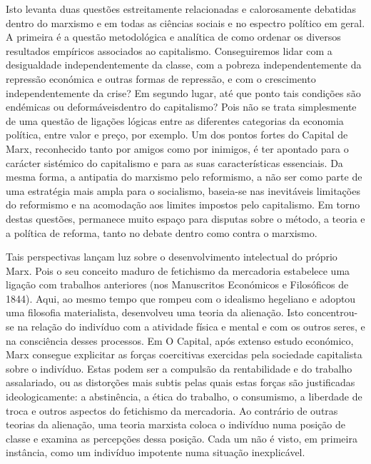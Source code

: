  \par 
Isto levanta duas questões estreitamente relacionadas e calorosamente debatidas dentro do marxismo e em todas as ciências sociais e no espectro político em geral. A primeira é a questão metodológica e analítica de como ordenar os diversos resultados empíricos associados ao capitalismo. Conseguiremos lidar com a desigualdade independentemente da classe, com a pobreza independentemente da repressão económica e outras formas de repressão, e com o crescimento independentemente da crise? Em segundo lugar, até que ponto tais condições são endémicas ou deformáveis ​​dentro do capitalismo? Pois não se trata simplesmente de uma questão de ligações lógicas entre as diferentes categorias da economia política, entre valor e preço, por exemplo. Um dos pontos fortes do Capital de Marx, reconhecido tanto por amigos como por inimigos, é ter apontado para o carácter sistémico do capitalismo e para as suas características essenciais. Da mesma forma, a antipatia do marxismo pelo reformismo, a não ser como parte de uma estratégia mais ampla para o socialismo, baseia-se nas inevitáveis ​​limitações do reformismo e na acomodação aos limites impostos pelo capitalismo. Em torno destas questões, permanece muito espaço para disputas sobre o método, a teoria e a política de reforma, tanto no debate dentro como contra o marxismo.
 \par 
Tais perspectivas lançam luz sobre o desenvolvimento intelectual do próprio Marx. Pois o seu conceito maduro de fetichismo da mercadoria estabelece uma ligação com trabalhos anteriores (nos Manuscritos Económicos e Filosóficos de 1844). Aqui, ao mesmo tempo que rompeu com o idealismo hegeliano e adoptou uma filosofia materialista, desenvolveu uma teoria da alienação. Isto concentrou-se na relação do indivíduo com a atividade física e mental e com os outros seres, e na consciência desses processos. Em O Capital, após extenso estudo económico, Marx consegue explicitar as forças coercitivas exercidas pela sociedade capitalista sobre o indivíduo. Estas podem ser a compulsão da rentabilidade e do trabalho assalariado, ou as distorções mais subtis pelas quais estas forças são justificadas ideologicamente: a abstinência, a ética do trabalho, o consumismo, a liberdade de troca e outros aspectos do fetichismo da mercadoria. Ao contrário de outras teorias da alienação, uma teoria marxista coloca o indivíduo numa posição de classe e examina as percepções dessa posição. Cada um não é visto, em primeira instância, como um indivíduo impotente numa situação inexplicável.
 \par 
